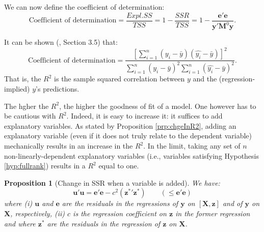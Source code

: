 \documentclass[
  12pt,
]{book}
\newtheorem{proposition}{Proposition}[chapter]
\theoremstyle{definition}
\theoremstyle{definition}
\theoremstyle{definition}
\theoremstyle{definition}
\theoremstyle{remark}
\begin{document}
We can now define the coefficient of determination:
\begin{equation}
\boxed{\mbox{Coefficient of determination} = \frac{Expl.SS}{TSS} = 1 - \frac{SSR}{TSS} = 1 - \frac{\mathbf{e}'\mathbf{e}}{\mathbf{y}'\mathbf{M}^0\mathbf{y}}.}\label{eq:RR2}
\end{equation}

It can be shown (\citet{Greene2003Econometric}, Section 3.5) that:
\[
\mbox{Coefficient of determination} = \frac{[\sum_{i=1}^n(y_i - \bar{y})(\hat{y_i} - \bar{y})]^2}{\sum_{i=1}^n(y_i - \bar{y})^2 \sum_{i=1}^n(\hat{y_i} - \bar{y})^2}.
\]
That is, the \(R^2\) is the sample squared correlation between \(y\) and the (regression-implied) \(y\)'s predictions.

The hgher the \(R^2\), the higher the goodness of fit of a model. One however has to be cautious with \(R^2\). Indeed, it is easy to increase it: it suffices to add explanatory variables. As stated by Proposition \ref{prp:chgeInR2}, adding an explanatory variable (even if it does not truly relate to the dependent variable) mechanically results in an increase in the \(R^2\). In the limit, taking any set of \(n\) non-linearly-dependent explanatory variables (i.e., variables satisfying Hypothesis \ref{hyp:fullrank}) results in a \(R^2\) equal to one.

\begin{proposition}[Change in SSR when a variable is added]
\protect\hypertarget{prp:chgeR2}{}\label{prp:chgeR2}We have:
\begin{equation}
\mathbf{u}'\mathbf{u} = \mathbf{e}'\mathbf{e} - c^2(\mathbf{z^*}'\mathbf{z^*}) \qquad (\le \mathbf{e}'\mathbf{e}) \label{eq:uu}
\end{equation}
where (i) \(\mathbf{u}\) and \(\mathbf{e}\) are the residuals in the regressions of \(\mathbf{y}\) on \([\mathbf{X},\mathbf{z}]\) and of \(\mathbf{y}\) on \(\mathbf{X}\), respectively, (ii) \(c\) is the regression coefficient on \(\mathbf{z}\) in the former regression and where \(\mathbf{z}^*\) are the residuals in the regression of \(\mathbf{z}\) on \(\mathbf{X}\).
\end{proposition}
\end{document}
